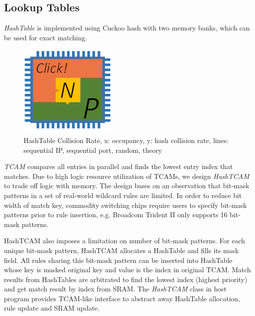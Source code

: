 \subsection{Lookup Tables}
\label{subsec:lookuptables}

\textit{HashTable} is implemented using Cuckoo hash \cite{pagh2004cuckoo} with two memory banks, which can be used for exact matching.

\begin{figure}[h!]
	\centering
	\includegraphics[width=0.6\columnwidth]{image/logo}
	\vspace{-0.15in}
	\caption{HashTable Collision Rate, x: occupancy, y: hash collision rate, lines: sequential IP, sequential port, random, theory}
	\vspace{-0.15in}
	\label{fig:HashTableCollisionRate}
\end{figure}

\textit{TCAM} compares all entries in parallel and finds the lowest entry index that matches. Due to high logic resource utilization of TCAMs, we design \textit{HashTCAM} to trade off logic with memory. The design bases on an observation that bit-mask patterns in a set of real-world wildcard rules are limited. In order to reduce bit width of match key, commodity switching chips require users to specify bit-mask patterns prior to rule insertion, e.g. Broadcom Trident II \cite{broadcomethernet} only supports 16 bit-mask patterns.

HashTCAM also imposes a limitation on number of bit-mask patterns. For each unique bit-mask pattern, HashTCAM allocates a HashTable and fills its mask field. All rules sharing this bit-mask pattern can be inserted into HashTable whose key is masked original key and value is the index in original TCAM. Match results from HashTables are arbitrated to find the lowest index (highest priority) and get match result by index from SRAM. The \textit{HashTCAM} class in host program provides TCAM-like interface to abstract away HashTable allocation, rule update and SRAM update.

